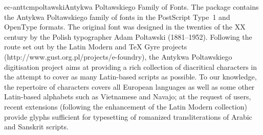\documentclass{ddltxtyp}
\begin{document}
\begin{package}{ec-anttcm}{poltawski}{Antykwa Poltawskiego Family of Fonts.}
The package contains the Antykwa Poltawskiego family of fonts
in the PostScript Type~1 and OpenType formats. The original
font was designed in the twenties of the XX century by the
Polish typographer Adam Poltawski (1881--1952). Following the
route set out by the Latin Modern and {\TeX} Gyre projects
(http://www.gust.org.pl/projects/e-foundry), the Antykwa
Poltawskiego digitisation project aims at providing a rich
collection of diacritical characters in the attempt to cover as
many Latin-based scripts as possible. To our knowledge, the
repertoire of characters covers all European languages as well
as some other Latin-based alphabets such as Vietnamese and
Navajo; at the request of users, recent extensions (following
the enhancement of the Latin Modern collection) provide glyphs
sufficient for typesetting of romanized transliterations of
Arabic and Sanskrit scripts. %
\end{package}
\end{document}
